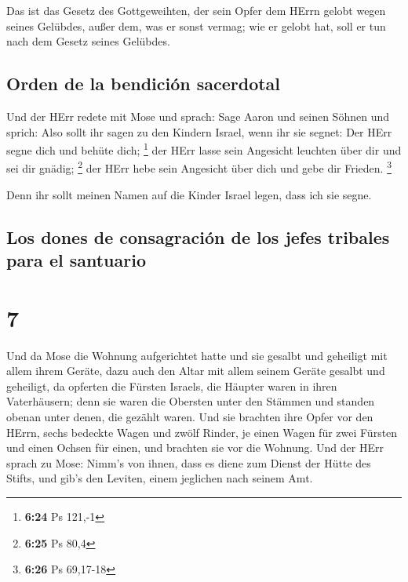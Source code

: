  Das ist das Gesetz des Gottgeweihten, der sein Opfer dem
HErrn gelobt wegen seines Gelübdes, außer dem, was er sonst vermag; wie
er gelobt hat, soll er tun nach dem Gesetz seines Gelübdes.

\hypertarget{orden-de-la-bendiciuxf3n-sacerdotal}{%
\subsection{Orden de la bendición
sacerdotal}\label{orden-de-la-bendiciuxf3n-sacerdotal}}

 Und der HErr redete mit Mose und sprach: 
Sage Aaron und seinen Söhnen und sprich: Also sollt ihr sagen zu den
Kindern Israel, wenn ihr sie segnet:  Der HErr segne dich
und behüte dich; \footnote{\textbf{6:24} Ps 121,-1}  der
HErr lasse sein Angesicht leuchten über dir und sei dir gnädig;
\footnote{\textbf{6:25} Ps 80,4}  der HErr hebe sein
Angesicht über dich und gebe dir Frieden. \footnote{\textbf{6:26} Ps
  69,17-18}

 Denn ihr sollt meinen Namen auf die Kinder Israel legen,
dass ich sie segne.

\hypertarget{los-dones-de-consagraciuxf3n-de-los-jefes-tribales-para-el-santuario}{%
\subsection{Los dones de consagración de los jefes tribales para el
santuario}\label{los-dones-de-consagraciuxf3n-de-los-jefes-tribales-para-el-santuario}}

\hypertarget{section-6}{%
\section{7}\label{section-6}}

 Und da Mose die Wohnung aufgerichtet hatte und sie
gesalbt und geheiligt mit allem ihrem Geräte, dazu auch den Altar mit
allem seinem Geräte gesalbt und geheiligt,  da opferten
die Fürsten Israels, die Häupter waren in ihren Vaterhäusern; denn sie
waren die Obersten unter den Stämmen und standen obenan unter denen, die
gezählt waren.  Und sie brachten ihre Opfer vor den HErrn,
sechs bedeckte Wagen und zwölf Rinder, je einen Wagen für zwei Fürsten
und einen Ochsen für einen, und brachten sie vor die Wohnung.
 Und der HErr sprach zu Mose:  Nimm's von
ihnen, dass es diene zum Dienst der Hütte des Stifts, und gib's den
Leviten, einem jeglichen nach seinem Amt.

